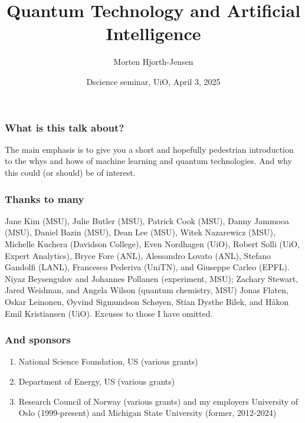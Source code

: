 \documentclass{beamer}
\begin{document}
\title[Quantum Computing and ML]{\textbf{Quantum Technology and Artificial Intelligence}}
\author{Morten Hjorth-Jensen}
\date{Dscience seminar, UiO, April 3, 2025}





\begin{frame}
\titlepage
\end{frame}

\begin{frame}
\frametitle{What is this talk about?}

\begin{block}{}
The main emphasis is to give you a short and hopefully pedestrian introduction to the whys and hows of machine learning and quantum technologies.
And why this could (or should) be of interest. 
\end{block}

\end{frame}

\begin{frame}
\frametitle{Thanks to many}

Jane Kim (MSU), Julie Butler (MSU), Patrick Cook (MSU), Danny Jammooa (MSU), Daniel Bazin (MSU), Dean Lee (MSU), Witek Nazarewicz (MSU), Michelle Kuchera (Davidson College), Even Nordhagen (UiO), Robert Solli (UiO, Expert Analytics), Bryce Fore (ANL), Alessandro Lovato (ANL), Stefano Gandolfi (LANL), Francesco Pederiva (UniTN), and Giuseppe Carleo (EPFL). 
Niyaz Beysengulov and Johannes Pollanen (experiment, MSU); Zachary Stewart, Jared Weidman, and Angela Wilson (quantum chemistry, MSU)
Jonas Flaten, Oskar Leinonen, Øyvind Sigmundson Schøyen, Stian Dysthe Bilek, and Håkon Emil Kristiansen (UiO). Excuses to those I have omitted.
\end{frame}

\begin{frame}
\frametitle{And sponsors}

\begin{enumerate}
\item National Science Foundation, US (various grants)

\item Department of Energy, US (various grants)

\item Research Council of Norway (various grants) and my employers University of Oslo (1999-present) and Michigan State University (former, 2012-2024)
\end{enumerate}

\end{frame}
\end{document}
